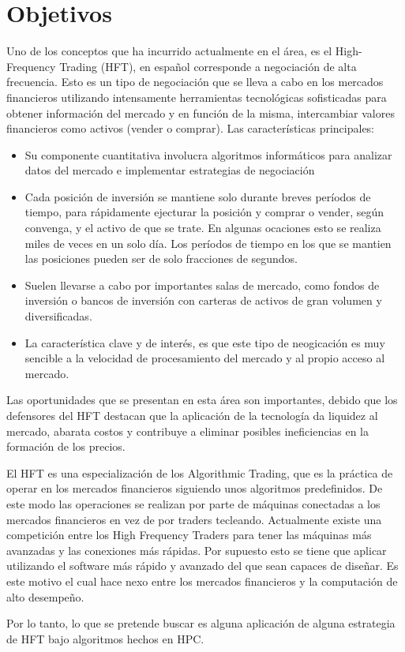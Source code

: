 \section{Objetivos}
Uno de los conceptos que ha incurrido actualmente en el área, es el High-Frequency Trading (HFT), en español corresponde a negociación de alta frecuencia.
Esto es un tipo de negociación que se lleva a cabo en los mercados financieros utilizando intensamente herramientas tecnológicas sofisticadas para obtener 
información del mercado y en función de la misma, intercambiar valores financieros como activos (vender o comprar). Las características principales:
\begin{itemize}
	\item Su componente cuantitativa involucra algoritmos informáticos para analizar datos del mercado e implementar estrategias de negociación
	\item Cada posición de inversión se mantiene solo durante breves períodos de tiempo, para rápidamente ejecturar la posición y comprar o vender, según
		convenga, y el activo de que se trate. En algunas ocaciones esto se realiza miles de veces en un solo día. Los períodos de tiempo en los que 
		se mantien las posiciones pueden ser de solo fracciones de segundos.
	\item Suelen llevarse a cabo por importantes salas de mercado, como fondos de inversión o bancos de inversión con carteras de activos
		de gran volumen y diversificadas.
	\item La característica clave y de interés, es que este tipo de neogicación es muy sencible a la velocidad de procesamiento del mercado y al propio 
		acceso al mercado.
\end{itemize}

Las oportunidades que se presentan en esta área son importantes, debido que los defensores del HFT destacan que la aplicación de la tecnología da liquidez al mercado,
abarata costos y contribuye a eliminar posibles ineficiencias en la formación de los precios. 

El HFT es una especialización de los Algorithmic Trading, que es la práctica de operar en los mercados financieros siguiendo unos algoritmos predefinidos. 
De este modo las operaciones se realizan por parte de máquinas conectadas a los mercados financieros en vez de por traders tecleando.
Actualmente existe una competición entre los High Frequency Traders para tener las máquinas más avanzadas y las conexiones más rápidas. Por supuesto esto se 
tiene que aplicar utilizando el software más rápido y avanzado del que sean capaces de diseñar. Es este motivo el cual hace nexo entre los mercados financieros 
y la computación de alto desempeño. 

Por lo tanto, lo que se pretende buscar es alguna aplicación de alguna estrategia de HFT bajo algoritmos hechos en HPC.
